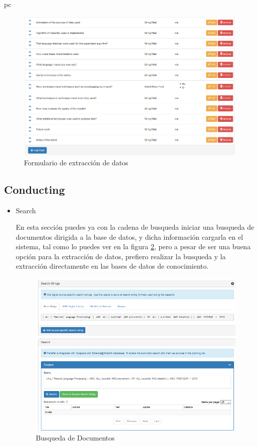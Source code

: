 pc\documentclass[a4paper,12pt,openany]{book}
\begin{document}
\begin{itemize}
\begin{itemize}
    \begin{figure}[H]
    \centering
	\includegraphics[width=12cm]{parsifal16.png}
    \caption{Formulario de extracción de datos}
    \label{fig:Parcifal16}
    \end{figure}

\end{itemize}

\subsection{Conducting}

\begin{itemize}
\item Search

En esta sección puedes ya con la cadena de busqueda iniciar una busqueda de documentos dirigida a la base de datos, y dicha información cargarla en el sistema, tal como lo puedes ver en la figura \ref{fig:Parcifal17}, pero a pesar de ser una buena opción para la extracción de datos, prefiero realizar la busqueda y la extracción directamente en las bases de datos de conocimiento. 

    \begin{figure}[H]
    \centering
	\includegraphics[width=12cm]{parsifal17.png}
    \caption{Busqueda de Documentos}
    \label{fig:Parcifal17}
    \end{figure}


\end{itemize}
\end{itemize}
\end{document}
